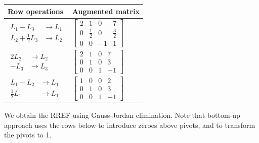 \documentclass[../linear-algebra.tex]{subfiles}
\begin{document}
\begin{table}[H]
\centering
\renewcommand{\arraystretch}{1.2}

\begin{tabular}{|>{\centering\arraybackslash}m{4.5cm}|>{\centering\arraybackslash}m{6.5cm}|}
    \hline
    
    \textbf{Row operations} & \textbf{Augmented matrix} \\ \hline
    \rule{0pt}{2.5em} 
    $\begin{aligned}
        L_1 - L_3 &\rightarrow L_1 \\
        L_2 + \frac{1}{2}L_3 &\rightarrow L_2
    \end{aligned}$ 
    & 
    $\left[
    \begin{array}{ccc|c}
         2 &  1 &  0 &  7 \\
         0 & \frac{1}{2} &  0 & \frac{3}{2} \\
         0 &  0 & -1 &  1
    \end{array}
    \right]$ 
    \\[2em] \hline
    
    \rule{0pt}{2.5em} 
    $\begin{aligned}
        2L_2 &\rightarrow L_2 \\
        -L_3 &\rightarrow L_3
    \end{aligned}$ 
    & 
    $\left[
    \begin{array}{ccc|c}
        2 & 1 & 0 & 7 \\
        0 & 1 & 0 & 3 \\
        0 & 0 & 1 & -1
    \end{array}
    \right]$ 
    \\[2em] \hline
    
    \rule{0pt}{2.5em} 
    $\begin{aligned}
        L_1 - L_2 &\rightarrow L_1 \\
        \frac{1}{2}L_1 &\rightarrow L_1
    \end{aligned}$ 
    & 
    $\left[
    \begin{array}{ccc|c}
        1 & 0 & 0 & 2 \\
        0 & 1 & 0 & 3 \\
        0 & 0 & 1 & -1
    \end{array}
    \right]$ 
    \\[2em] \hline
\end{tabular}
\end{table}
\noindent We obtain the RREF using Gauss-Jordan elimination.
Note that bottom-up approach uses the rows below to introduce zeroes above pivots,
and to transform the pivots to 1.
\end{document}
